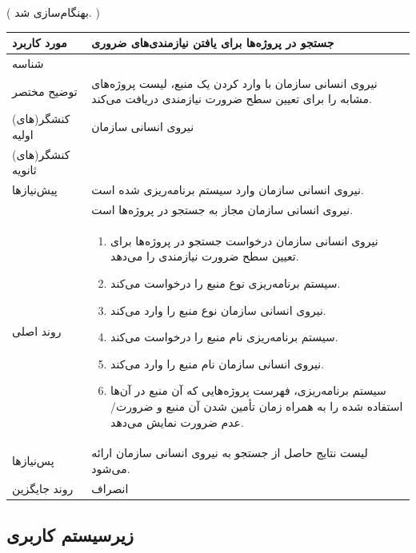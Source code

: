 \newpage
({\color{red} بهنگام‌سازی شد. })
\begin{table}[H]
	\centering
	\begin{tabular}{|p{3cm}|p{10cm}|}
		\hline
		مورد کاربرد & جستجو در پروژه‌ها برای یافتن نیازمندی‌های ضروری  \\
		\hline
		شناسه & 
		\stepcounter{usecase_ID}
		\arabic{usecase_ID} \\
		\hline
		توضیح مختصر & نیروی انسانی سازمان با وارد کردن یک منبع، لیست پروژه‌های مشابه را برای تعیین سطح ضرورت نیازمندی دریافت می‌کند. \\
		\hline
		کنشگر(های) اولیه & نیروی انسانی سازمان \\
		\hline
		کنشگر(های) ثانویه &  \\
		\hline
		پیش‌نیازها & نیروی انسانی سازمان وارد سیستم برنامه‌ریزی شده است. \\
		& نیروی انسانی سازمان مجاز به جستجو در پروژه‌ها است. \\
		\hline
		
		روند اصلی &
		\begin{enumerate}[topsep=0cm,leftmargin=0.5cm]
			\item نیروی انسانی سازمان درخواست جستجو در پروژه‌ها برای تعیین سطح ضرورت نیازمندی را می‌دهد.
			\item سیستم برنامه‌ریزی نوع منبع را درخواست می‌کند. 
			\item نیروی انسانی سازمان نوع منبع را وارد می‌کند. 
			\item سیستم برنامه‌ریزی نام منبع را درخواست می‌کند. 
			\item نیروی انسانی سازمان نام منبع را وارد می‌کند. 
			\item سیستم برنامه‌ریزی، فهرست پروژه‌هایی که آن منبع در آن‌ها استفاده شده را به همراه زمان تأمین شدن آن منبع و ضرورت/عدم ضرورت نمایش می‌دهد.
		\end{enumerate} \\
		
		\hline
		
		پس‌نیازها & لیست نتایج حاصل از جستجو به نیروی انسانی سازمان ارائه می‌شود. \\
		\hline
		روند جایگزین & انصراف \\
		\hline
	\end{tabular}
\end{table}

\subsection{زیرسیستم کاربری}

